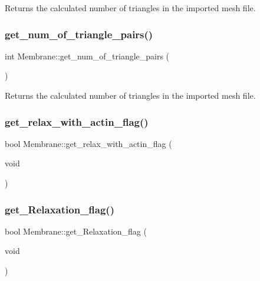Returns the calculated number of triangles in the imported mesh file. \mbox{\label{classMembrane_a7aefd8327b0c02828efc321fd1ae7f07}} 
\subsubsection{\texorpdfstring{get\_num\_of\_triangle\_pairs()}{get\_num\_of\_triangle\_pairs()}}
{\footnotesize\ttfamily int Membrane\+::get\+\_\+num\+\_\+of\+\_\+triangle\+\_\+pairs (\begin{DoxyParamCaption}{ }\end{DoxyParamCaption})\hspace{0.3cm}{\ttfamily [inline]}}

Returns the calculated number of triangles in the imported mesh file. \mbox{\label{classMembrane_a3030a224f8b882e0bdec2d1fd6861304}} 
\subsubsection{\texorpdfstring{get\_relax\_with\_actin\_flag()}{get\_relax\_with\_actin\_flag()}}
{\footnotesize\ttfamily bool Membrane\+::get\+\_\+relax\+\_\+with\+\_\+actin\+\_\+flag (\begin{DoxyParamCaption}\item[{void}]{ }\end{DoxyParamCaption})\hspace{0.3cm}{\ttfamily [inline]}}

\mbox{\label{classMembrane_a992f7a356099ef58417254d8218fe357}} 
\subsubsection{\texorpdfstring{get\_Relaxation\_flag()}{get\_Relaxation\_flag()}}
{\footnotesize\ttfamily bool Membrane\+::get\+\_\+\+Relaxation\+\_\+flag (\begin{DoxyParamCaption}\item[{void}]{ }\end{DoxyParamCaption})\hspace{0.3cm}{\ttfamily [inline]}}

